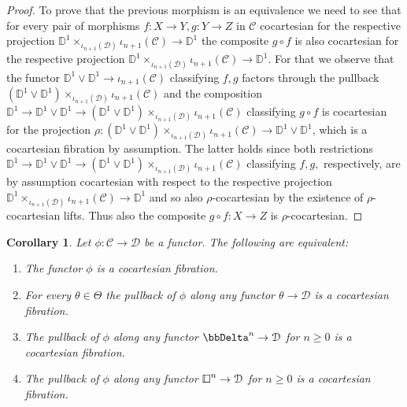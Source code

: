 \documentclass[10pt,oneside]{article}
\numberwithin{equation}{section} %
\numberwithin{figure}{section} %
\theoremstyle{plain}
\newtheorem{corollary}[theorem]{Corollary}
\theoremstyle{definition}
\newcommand{\bD}{{\mathbb D}}
\newcommand{\mC}{{\mathcal C}}
\newcommand{\mD}{{\mathcal D}}
\newcommand{\cube}{{\,\vline\negmedspace\square}}
\begin{document}
\begin{proof}
To prove that the previous morphism is an equivalence we need to see that for every pair of morphisms $f: X \to Y, g: Y \to Z $ in $\mC$ cocartesian for the respective projection $\bD^1 \times_{\iota_{n+1}(\mD)} \iota_{n+1}(\mC) \to \bD^1$ the 
composite $g \circ f$ is also cocartesian for the respective projection $\bD^1 \times_{\iota_{n+1}(\mD)} \iota_{n+1}(\mC) \to \bD^1$.
For that we observe that the functor
$\bD^1 \vee \bD^1 \to \iota_{n+1}(\mC)$ classifying $f,g $ factors through the pullback 
$ (\bD^1 \vee \bD^1) \times_{\iota_{n+1}(\mD)} \iota_{n+1}(\mC) $
and the composition $\bD^1 \to \bD^1 \vee \bD^1 \to (\bD^1 \vee \bD^1) \times_{\iota_{n+1}(\mD)} \iota_{n+1}(\mC) $ classifying $g \circ f$ is 
cocartesian for the projection $\rho: (\bD^1 \vee \bD^1) \times_{\iota_{n+1}(\mD)} \iota_{n+1}(\mC) \to \bD^1 \vee \bD^1$, which is a cocartesian fibration by assumption. 
The latter holds since both restrictions $\bD^1 \to \bD^1 \vee \bD^1 \to (\bD^1 \vee \bD^1) \times_{\iota_{n+1}(\mD)} \iota_{n+1}(\mC) $ classifying $f,g,$ respectively, are by assumption cocartesian with respect to the respective projection $\bD^1 \times_{\iota_{n+1}(\mD)} \iota_{n+1}(\mC) \to \bD^1$ and so also $\rho$-cocartesian by the existence of $\rho$-cocartesian lifts.
Thus also the composite $g \circ f: X \to Z$ is $\rho$-cocartesian.
\end{proof}

\begin{corollary}\label{thetalocal} Let $\phi: \mC \to \mD$ be a functor.
The following are equivalent:

\begin{enumerate}[\normalfont(1)]\setlength{\itemsep}{-2pt}
\item The functor $\phi$ is a cocartesian fibration.

\item For every $\theta \in \Theta$ the pullback of $\phi$ along any functor $\theta \to \mD$ is a cocartesian fibration.

\item The pullback of $\phi$ along any functor $\bbDelta^n \to \mD$
for $n \geq 0 $ is a cocartesian fibration.

\item The pullback of $\phi$ along any functor $\cube^n \to \mD$
for $n \geq 0 $ is a cocartesian fibration.

\end{enumerate}

\end{corollary}
\end{document}

